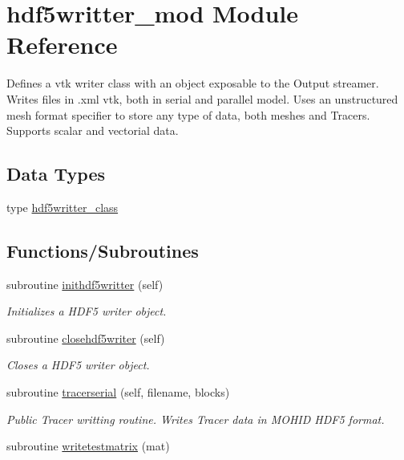\hypertarget{namespacehdf5writter__mod}{}\section{hdf5writter\+\_\+mod Module Reference}
\label{namespacehdf5writter__mod}


Defines a vtk writer class with an object exposable to the Output streamer. Writes files in .xml vtk, both in serial and parallel model. Uses an unstructured mesh format specifier to store any type of data, both meshes and Tracers. Supports scalar and vectorial data.  


\subsection*{Data Types}
\begin{DoxyCompactItemize}
\item 
type \mbox{\hyperlink{structhdf5writter__mod_1_1hdf5writter__class}{hdf5writter\+\_\+class}}
\end{DoxyCompactItemize}
\subsection*{Functions/\+Subroutines}
\begin{DoxyCompactItemize}
\item 
subroutine \mbox{\hyperlink{namespacehdf5writter__mod_a2409af91a67db06badcb9ae439142f92}{inithdf5writter}} (self)
\begin{DoxyCompactList}\small\item\em Initializes a H\+D\+F5 writer object. \end{DoxyCompactList}\item 
subroutine \mbox{\hyperlink{namespacehdf5writter__mod_a0318c234490ab15f480e7f940266ec4f}{closehdf5writer}} (self)
\begin{DoxyCompactList}\small\item\em Closes a H\+D\+F5 writer object. \end{DoxyCompactList}\item 
subroutine \mbox{\hyperlink{namespacehdf5writter__mod_a5f79038dbb067a692a12d171e51b5703}{tracerserial}} (self, filename, blocks)
\begin{DoxyCompactList}\small\item\em Public Tracer writting routine. Writes Tracer data in M\+O\+H\+ID H\+D\+F5 format. \end{DoxyCompactList}\item 
subroutine \mbox{\hyperlink{namespacehdf5writter__mod_adc4cbad9398ee6e9cb5723a30a7c44b1}{writetestmatrix}} (mat)
\end{DoxyCompactItemize}


